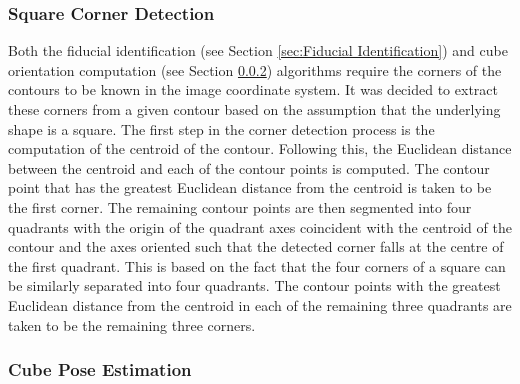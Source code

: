 
\subsubsection{Square Corner Detection} \label{sec:Square Corner Detection}

Both the fiducial identification (see Section \ref{sec:Fiducial Identification}) and cube orientation computation (see Section \ref{sec:Cube Pose Estimation}) algorithms require the corners of the contours to be known in the image coordinate system. It was decided to extract these corners from a given contour based on the assumption that the underlying shape is a square. The first step in the corner detection process is the computation of the centroid of the contour. Following this, the Euclidean distance between the centroid and each of the contour points is computed. The contour point that has the greatest Euclidean distance from the centroid is taken to be the first corner. The remaining contour points are then segmented into four quadrants with the origin of the quadrant axes coincident with the centroid of the contour and the axes oriented such that the detected corner falls at the centre of the first quadrant. This is based on the fact that the four corners of a square can be similarly separated into four quadrants. The contour points with the greatest Euclidean distance from the centroid in each of the remaining three quadrants are taken to be the remaining three corners.


\subsubsection{Cube Pose Estimation} \label{sec:Cube Pose Estimation}

